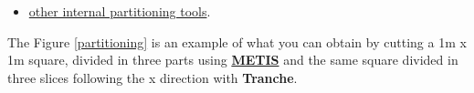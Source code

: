 \begin{itemize}









\item \href{../../Outils/TRIOXDATA/XTriou/doc.pdf\#partitionneurderiv}{other internal partitioning tools}.
\end{itemize}

\newpage
The Figure \ref{partitioning} is an example of what you can obtain by cutting a 1m x 1m square, divided in three parts using \href{http://glaros.dtc.umn.edu/gkhome/views/metis}{\textbf{METIS}} and the same square divided in three slices following the x direction with \textbf{Tranche}.

